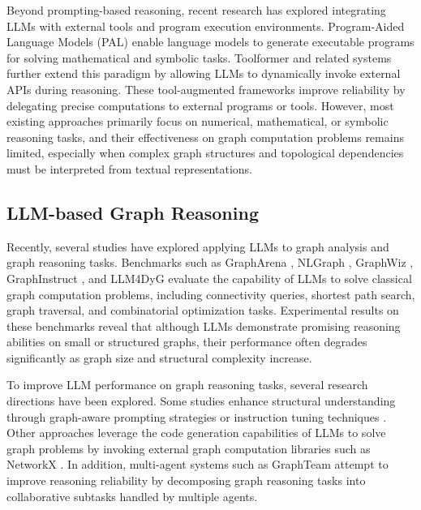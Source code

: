 \documentclass[sigconf,review,anonymous]{acmart}
\begin{document}
Beyond prompting-based reasoning, recent research has explored integrating LLMs with external tools and program execution environments. 
Program-Aided Language Models (PAL) \cite{gao2023pal} enable language models to generate executable programs for solving mathematical and symbolic tasks. 
Toolformer \cite{schick2023toolformer} and related systems \cite{critic2023,qin2023toolllm} further extend this paradigm by allowing LLMs to dynamically invoke external APIs during reasoning. 
These tool-augmented frameworks improve reliability by delegating precise computations to external programs or tools. 
However, most existing approaches primarily focus on numerical, mathematical, or symbolic reasoning tasks, and their effectiveness on graph computation problems remains limited, especially when complex graph structures and topological dependencies must be interpreted from textual representations.

\subsection{LLM-based Graph Reasoning}

Recently, several studies have explored applying LLMs to graph analysis and graph reasoning tasks. 
Benchmarks such as GraphArena \cite{tang2025grapharena}, NLGraph \cite{chen2024nlgraph}, GraphWiz \cite{gong2024graphwiz}, GraphInstruct \cite{graphinstruct2024}, and LLM4DyG \cite{llm4dyg2024} evaluate the capability of LLMs to solve classical graph computation problems, including connectivity queries, shortest path search, graph traversal, and combinatorial optimization tasks. 
Experimental results on these benchmarks reveal that although LLMs demonstrate promising reasoning abilities on small or structured graphs, their performance often degrades significantly as graph size and structural complexity increase.

To improve LLM performance on graph reasoning tasks, several research directions have been explored. 
Some studies enhance structural understanding through graph-aware prompting strategies or instruction tuning techniques \cite{tang2024graphgpt,pan2024graphllm}. 
Other approaches leverage the code generation capabilities of LLMs to solve graph problems by invoking external graph computation libraries such as NetworkX \cite{zhang2025gcoder,pseudocode2025}. 
In addition, multi-agent systems such as GraphTeam \cite{li2024graphteam} attempt to improve reasoning reliability by decomposing graph reasoning tasks into collaborative subtasks handled by multiple agents.
\end{document}
